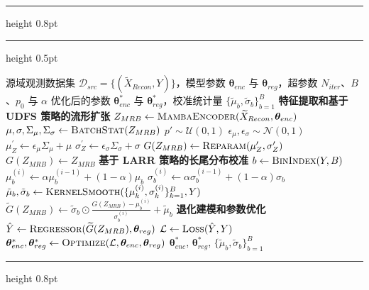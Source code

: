 \vspace{1em}
\hrule height 0.8pt
\vspace{3pt}
\begingroup
\captionsetup{singlelinecheck=false, justification=raggedright, font=normalsize}
\label{alg:udfs_larr_training}
\endgroup
\vspace{3pt}
\hrule height 0.5pt
\vspace{3pt}
\begingroup
\linespread{1.25}\selectfont
\begin{algorithmic}[1]
    \Require 源域观测数据集 $\mathcal{D}_{src}=\{(\widetilde{X}_{Recon}, Y)\}$，模型参数 $\bm{\theta}_{enc}$ 与 $\bm{\theta}_{reg}$，超参数 $N_{iter}$、$B$、$p_0$ 与 $\alpha$
    \Ensure 优化后的参数 $\bm{\theta}_{enc}^*$ 与 $\bm{\theta}_{reg}^*$，校准统计量 $\{\tilde{\mu}_{b}, \tilde{\sigma}_{b}\}_{b=1}^{B}$
    \Statex \textbf{特征提取和基于 UDFS 策略的流形扩张}
     
            \State $Z_{MRB} \leftarrow \textsc{MambaEncoder}(\widetilde{X}_{Recon}, \bm{\theta}_{enc})$
            \State $\mu, \sigma, \Sigma_{\mu}, \Sigma_{\sigma} \leftarrow \textsc{BatchStat}(Z_{MRB})$
            \State $p' \sim \mathcal{U}(0,1)$
                \State $\epsilon_{\mu}, \epsilon_{\sigma} \sim \mathcal{N}(0,1)$
                \State $\mu_{Z}^{\prime} \leftarrow \epsilon_{\mu}\Sigma_{\mu}+\mu$
                \State $\sigma_{Z}^{\prime} \leftarrow \epsilon_{\sigma}\Sigma_{\sigma}+\sigma$
                \State $G(Z_{MRB}) \leftarrow \textsc{Reparam}(\mu_{Z}^{\prime}, \sigma_{Z}^{\prime})$
            \Else
                \State $G(Z_{MRB}) \leftarrow Z_{MRB}$
            \EndIf
    \Statex \textbf{基于 LARR 策略的长尾分布校准}
            \State $b \leftarrow \textsc{BinIndex}(Y, B)$
            \State $\mu_{b}^{(i)} \leftarrow \alpha\mu_{b}^{(i-1)}+(1-\alpha)\mu_{b}$
            \State $\sigma_{b}^{(i)} \leftarrow \alpha\sigma_{b}^{(i-1)}+(1-\alpha)\sigma_{b}$
            \State $\tilde{\mu}_{b}, \tilde{\sigma}_{b} \leftarrow \textsc{KernelSmooth}(\{\mu_{k}^{(i)}, \sigma_{k}^{(i)}\}_{k=1}^B, Y)$
            \State $\widetilde{G}(Z_{MRB}) \leftarrow \tilde{\sigma}_{b} \odot \frac{G(Z_{MRB}) - \mu_{b}^{(i)}}{\sigma_{b}^{(i)}} + \tilde{\mu}_{b}$
    \Statex \textbf{退化建模和参数优化}
            \State $\hat{Y} \leftarrow \textsc{Regressor}(\widetilde{G}(Z_{MRB}), \bm{\theta}_{reg})$
            \State $\mathcal{L} \leftarrow \textsc{Loss}(\hat{Y}, Y)$
            \State $\bm{\theta}_{enc}^*, \bm{\theta}_{reg}^* \leftarrow \textsc{Optimize}(\mathcal{L}, \bm{\theta}_{enc}, \bm{\theta}_{reg})$
        \EndFor
    \EndFor
    \State \Return $\bm{\theta}_{enc}^*$, $\bm{\theta}_{reg}^*$, $\{\tilde{\mu}_{b}, \tilde{\sigma}_{b}\}_{b=1}^{B}$
\end{algorithmic}
\endgroup
\vspace{3pt}
\hrule height 0.8pt
\vspace{1em}


